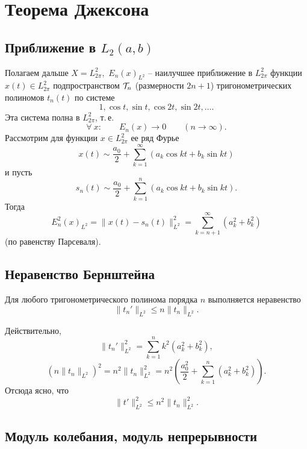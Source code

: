 
\chapter{Теорема Джексона}

\section{Приближение в $L_2(a,b)$}


Полагаем дальше $X=L^2_{2\pi},$ $E_n(x)_{L^2}$ -- наилучшее
приближение в $L^2_{2\pi}$ функции $x(t)\in L^2_{2\pi}$
подпространством ${\cal T}_n$ (размерности $2n+1$)
тригонометрических полиномов $t_n(t)$ по системе
$$
1,\cos t,\sin t,\cos 2t,\sin 2t,\ldots.
$$
Эта система полна в {$L^2_{2\pi}$}, т.\,е.
$$
\forall\ x:\qquad E_n(x) \longrightarrow 0\qquad (n\to \infty).
$$
Рассмотрим для функции $x\in L^2_{2\pi}$ ее ряд Фурье
$$
x(t)\sim \frac{a_0}{2}+\sum\limits_{k=1}^{\infty} {(a_k \cos kt+b_k\sin kt)}
$$
и пусть
$$
s_n(t)\sim \frac{a_0}{2}+\sum\limits_{k=1}^{n} {(a_k \cos kt+b_k\sin kt)}.
$$
Тогда
$$
E_n^2(x)_{L^2}=\|x(t)-s_n(t)\|_{{L^2}}^2=\sum\limits_{k=n+1}^{\infty}(a_k^2+b_k^2)
$$
(по равенству Парсеваля).

\section{Неравенство Бернштейна}

Для любого тригонометрического полинома порядка $n$ выполняется неравенство
$$\|t_n'\|_{{L^2}}\le n\|t_n\|_{{L^2}}.$$


Действительно,
$$
\|t_n'\|_{{L^2}}^2 ={\sum\limits_{k=1}^n k^2}(a_k^2+b_k^2),
$$
$$
(n\|t_n\|_{{L^2}})^2=n^2\|t_n\|_{{L^2}}^2=n^2\left(
\frac{a_0^2}{2}+\sum\limits_{k=1}^n (a_k^2+b_k^2)\right).
$$
Отсюда ясно, что
$$
\|t'\|_{{L^2}}^2\le n^2\|t_n\|^2_{{L^2}}.
$$

\section{Модуль колебания, модуль непрерывности}

